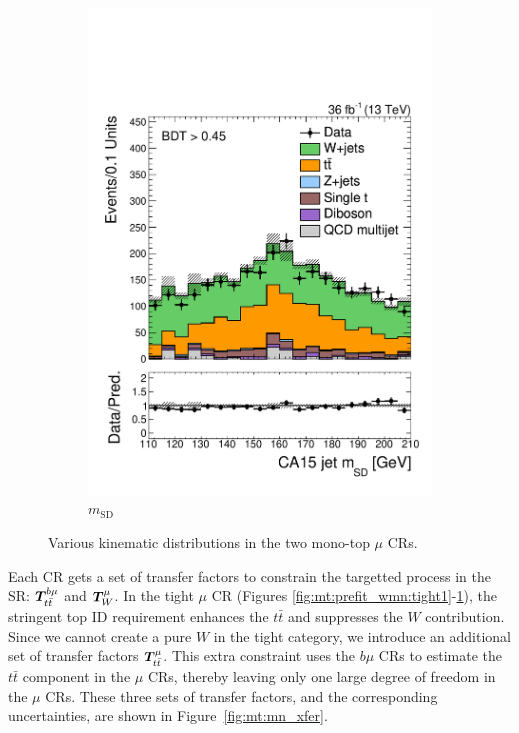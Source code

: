 \begin{figure}[]
\begin{center}
\begin{subfigure}[t]{0.32\textwidth}
            \includegraphics[width=\textwidth]{figures/monotop/prefit/singlemuonw_tight_fj1MSD.pdf}
            \caption{$m_\mathrm{SD}$}
            \label{fig:mt:prefit_wmn:tight2}
        \end{subfigure}
        \caption{Various kinematic distributions in the two mono-top $\mu$ CRs. }
        \label{fig:mt:prefit_wmn}
    \end{center}
\end{figure}

Each CR gets a set of transfer factors to constrain the targetted process in the SR: $\bm{T}^{b\mu}_{t\bar{t}}$ and $\bm{T}^{\mu}_{W}$.
In the tight $\mu$ CR (Figures \ref{fig:mt:prefit_wmn:tight1}-\ref{fig:mt:prefit_wmn:tight2}), the stringent top ID requirement enhances the $t\bar{t}$ and suppresses the $W$ contribution.
Since we cannot create a pure $W$ in the tight category, we introduce an additional set of transfer factors $\bm{T}^{\mu}_{t\bar{t}}$.
This extra constraint uses the $b\mu$ CRs to estimate the $t\bar{t}$ component in the $\mu$ CRs, thereby leaving only one large degree of freedom in the $\mu$ CRs.
These three sets of transfer factors, and the corresponding uncertainties, are shown in Figure~\ref{fig:mt:mn_xfer}.


